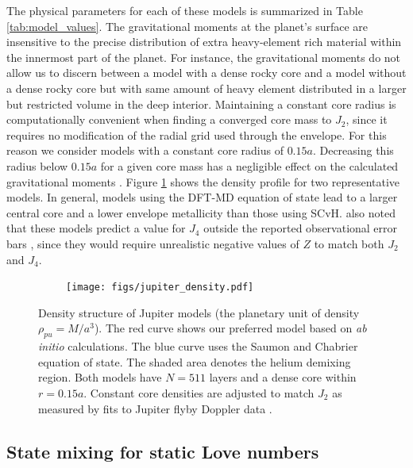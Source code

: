 The physical parameters for each of these models is summarized in Table
\ref{tab:model_values}. The gravitational moments at the planet's surface are
insensitive to the precise distribution of extra heavy-element rich material within the
innermost part of the planet. For instance, 
the gravitational moments do not allow us to discern between a model
with a dense rocky core and a model without a dense rocky core but with same amount
of heavy element distributed in a larger but restricted volume in the deep interior. 
Maintaining a constant core radius is
computationally convenient when finding a converged core mass to $J_{2}$, since it
requires no modification of the radial grid used through the envelope. For this
reason we consider models with a constant core radius of $0.15a$. Decreasing this
radius below $0.15a$ for a given core mass has a negligible effect on the calculated
gravitational moments \citep{hubbard2016}. Figure \ref{fig:density_jupiter} shows
the density profile for two representative models.  In general, models using the
DFT-MD equation of state lead to a larger central core and a lower envelope
metallicity than those using SCvH.  \citet{hubbard2016} also noted that these models
predict a value for $J_4$ outside the reported observational error bars
\citep{jacobson2003}, since they would require unrealistic negative values of $Z$ to
match both $J_2$ and $J_4$.

\begin{figure}[h!]  
  \centering
    \texttt{[image: figs/jupiter\_density.pdf]}
\caption{   Density structure of Jupiter models (the planetary unit of
density $\rho_{pu}=M/a^3$).  The red curve shows our preferred
    model based on \textit{ab initio} calculations. The blue curve uses the Saumon and
    Chabrier equation of state. The shaded area denotes the helium demixing region.
    Both models have $N=511$ layers and a dense core within $r=0.15a$.  Constant core
    densities are adjusted to match $J_2$ as measured by fits to Jupiter flyby Doppler
    data \citep{jacobson2003}.}
\label{fig:density_jupiter}
\end{figure}

\subsection{State mixing for static Love numbers} \label{state_mixing}

